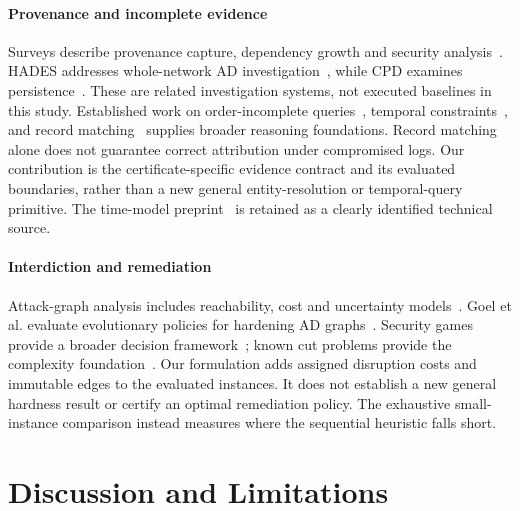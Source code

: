 \paragraph{Provenance and incomplete evidence}
Surveys describe provenance capture, dependency growth and security analysis~\cite{zipperle2023survey,provenance2023security}. HADES addresses whole-network AD investigation~\cite{liu2026hades}, while CPD examines persistence~\cite{liu2026cpd}. These are related investigation systems, not executed baselines in this study. Established work on order-incomplete queries~\cite{amarilli2017order}, temporal constraints~\cite{dechter1991temporal}, and record matching~\cite{elmagarmid2007duplicate} supplies broader reasoning foundations. Record matching alone does not guarantee correct attribution under compromised logs. Our contribution is the certificate-specific evidence contract and its evaluated boundaries, rather than a new general entity-resolution or temporal-query primitive. The time-model preprint~\cite{heinzl2026timestamps} is retained as a clearly identified technical source.

\paragraph{Interdiction and remediation}
Attack-graph analysis includes reachability, cost and uncertainty models~\cite{zeng2019attackgraphs}. Goel et al. evaluate evolutionary policies for hardening AD graphs~\cite{goel2024hardening}. Security games provide a broader decision framework~\cite{tambe2011security}; known cut problems provide the complexity foundation~\cite{garg1994multiway,dahlhaus1994multiterminal}. Our formulation adds assigned disruption costs and immutable edges to the evaluated instances. It does not establish a new general hardness result or certify an optimal remediation policy. The exhaustive small-instance comparison instead measures where the sequential heuristic falls short.

\section{Discussion and Limitations}
\label{sec:discussion}
